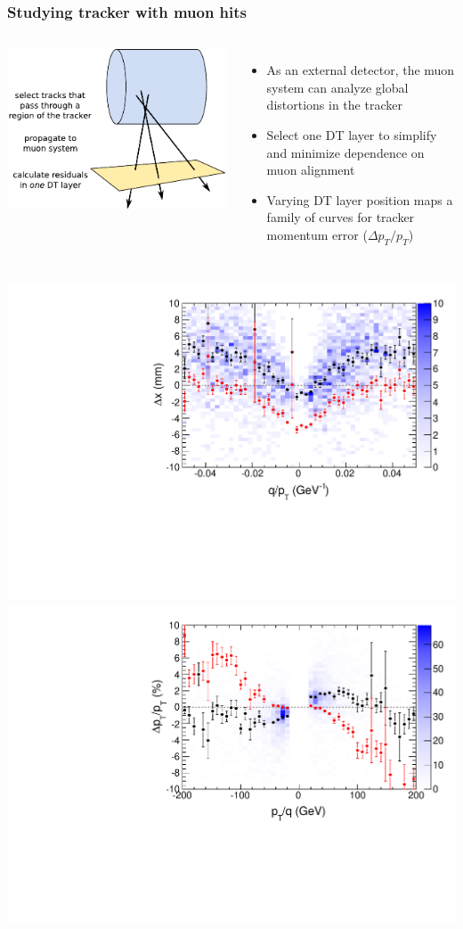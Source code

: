 \documentclass[compress]{beamer}
\begin{document}
\begin{frame}
\frametitle{Studying tracker with muon hits}

\vspace{0.25 cm}
\begin{columns}
\includegraphics[width=\linewidth]{method.pdf}

\begin{itemize}
\item As an external detector, the muon system can analyze global distortions in the tracker
\item Select one DT layer to simplify and minimize dependence on muon alignment
\item Varying DT layer position maps a family of curves for tracker momentum error \mbox{($\Delta p_T/p_T$)\hspace{-1 cm}}
\end{itemize}
\end{columns}

\vspace{0.25 cm}
\includegraphics[width=0.5\linewidth]{residuals_real_both.pdf}\mbox{\hspace{0.2 cm}}\includegraphics[width=0.5\linewidth]{momenta_real_both.pdf}


\end{frame}
\end{document}
